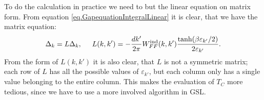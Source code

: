 To do the calculation in practice we need to but the linear equation on matrix form. From equation \eqref{eq.GapequationIntegralLinear} it is clear, that we have the matrix equation:
\begin{equation}
\Delta_k = L \Delta_k, \hspace{0.5cm} L(k,k') = -\frac{dk'}{2\pi} W^\text{ind}_{FF}(k,k')\frac{\tanh(\beta \varepsilon_{k'}/2)}{2\varepsilon_{k'}}. 
\label{eq.Gapmatrixequation}
\end{equation}
From the form of $L(k,k')$ it is also clear, that $L$ is not a symmetric matrix; each row of $L$ has all the possible values of $\varepsilon_{k'}$, but each column only has a single value belonging to the entire column. This makes the evaluation of $T_C$ more tedious, since we have to use a more involved algorithm in GSL.  


